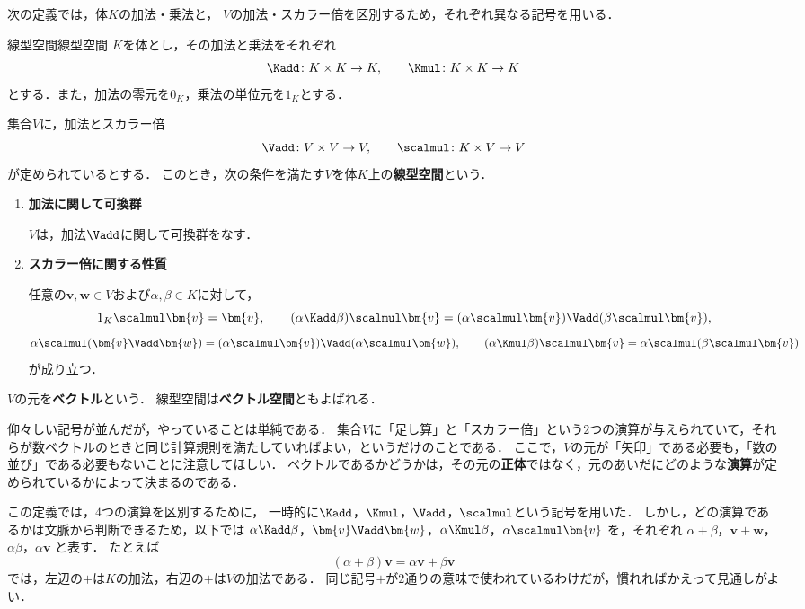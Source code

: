 次の定義では，体$K$の加法・乗法と，
$V$の加法・スカラー倍を区別するため，それぞれ異なる記号を用いる．

\begin{definition}{線型空間}{線型空間}
  $K$を体とし，その加法と乗法をそれぞれ
  \[
    \Kadd\colon K\times K\to K,
    \qquad
    \Kmul\colon K\times K\to K
  \]
  とする．また，加法の零元を$0_K$，乗法の単位元を$1_K$とする．

  集合$V$に，加法とスカラー倍
  \[
    \Vadd\colon V\times V\to V,
    \qquad
    \scalmul\colon K\times V\to V
  \]
  が定められているとする．
  このとき，次の条件を満たす$V$を体$K$上の\textbf{線型空間}という．

  \begin{enumerate}[label=(\roman*),leftmargin=3.2em]
    \item \textbf{加法に関して可換群}

    $V$は，加法$\Vadd$に関して可換群をなす．

    \item \textbf{スカラー倍に関する性質}

    任意の$\bm{v},\bm{w}\in V$および$\alpha,\beta\in K$に対して，
    \[
      1_K\scalmul\bm{v}=\bm{v},
      \qquad
      (\alpha\Kadd\beta)\scalmul\bm{v}
      =
      (\alpha\scalmul\bm{v})\Vadd(\beta\scalmul\bm{v}),
    \]
    \[
      \alpha\scalmul(\bm{v}\Vadd\bm{w})
      =
      (\alpha\scalmul\bm{v})\Vadd(\alpha\scalmul\bm{w}),
      \qquad
      (\alpha\Kmul\beta)\scalmul\bm{v}
      =
      \alpha\scalmul(\beta\scalmul\bm{v})
    \]
    が成り立つ．
  \end{enumerate}

  $V$の元を\textbf{ベクトル}という．
  線型空間は\textbf{ベクトル空間}ともよばれる．
\end{definition}

仰々しい記号が並んだが，やっていることは単純である．
集合$V$に「足し算」と「スカラー倍」という$2$つの演算が与えられていて，それらが数ベクトルのときと同じ計算規則を満たしていればよい，というだけのことである．
ここで，$V$の元が「矢印」である必要も，「数の並び」である必要もないことに注意してほしい．
ベクトルであるかどうかは，その元の\textbf{正体}ではなく，元のあいだにどのような\textbf{演算}が定められているかによって決まるのである．

この定義では，$4$つの演算を区別するために，
一時的に$\Kadd$，$\Kmul$，$\Vadd$，$\scalmul$という記号を用いた．
しかし，どの演算であるかは文脈から判断できるため，以下では
$\alpha\Kadd\beta$，$\bm{v}\Vadd\bm{w}$，$\alpha\Kmul\beta$，$\alpha\scalmul\bm{v}$
を，それぞれ
$\alpha+\beta$，$\bm{v}+\bm{w}$，$\alpha\beta$，$\alpha\bm{v}$
と表す．
たとえば
\[
  (\alpha+\beta)\bm{v}
  =
  \alpha\bm{v}+\beta\bm{v}
\]
では，左辺の$+$は$K$の加法，右辺の$+$は$V$の加法である．
同じ記号$+$が$2$通りの意味で使われているわけだが，慣れればかえって見通しがよい．

